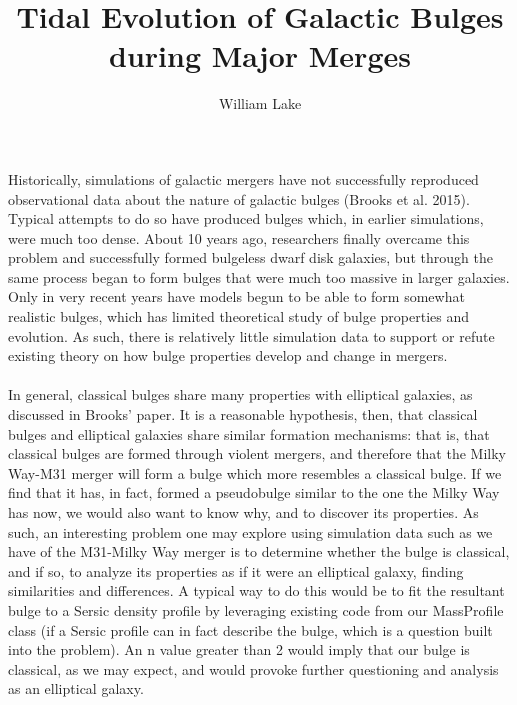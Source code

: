 \documentclass[a4paper]{article}
\title{Tidal Evolution of Galactic Bulges during Major Merges}
\author{William Lake}
\begin{document}
\maketitle

\paragraph{}

Historically, simulations of galactic mergers have not successfully reproduced observational data about the nature of galactic bulges (Brooks et al. 2015). Typical attempts to do so have produced bulges which, in earlier simulations, were much too dense. About 10 years ago, researchers finally overcame this problem and successfully formed bulgeless dwarf disk galaxies, but through the same process began to form bulges that were much too massive in larger galaxies. Only in very recent years have models begun to be able to form somewhat realistic bulges, which has limited theoretical study of bulge properties and evolution. As such, there is relatively little simulation data to support or refute existing theory on how bulge properties develop and change in mergers.

\paragraph{}

	In general, classical bulges share many properties with elliptical galaxies, as discussed in Brooks' paper. It is a reasonable hypothesis, then, that classical bulges and elliptical galaxies share similar formation mechanisms: that is, that classical bulges are formed through violent mergers, and therefore that the Milky Way-M31 merger will form a bulge which more resembles a classical bulge. If we find that it has, in fact, formed a pseudobulge similar to the one the Milky Way has now, we would also want to know why, and to discover its properties. As such, an interesting problem one may explore using simulation data such as we have of the M31-Milky Way merger is to determine whether the bulge is classical, and if so, to analyze its properties as if it were an elliptical galaxy, finding similarities and differences. A typical way to do this would be to fit the resultant bulge to a Sersic density profile by leveraging existing code from our MassProfile class (if a Sersic profile can in fact describe the bulge, which is a question built into the problem). An n value greater than 2 would imply that our bulge is classical, as we may expect, and would provoke further questioning and analysis as an elliptical galaxy. 
    
\end{document}
